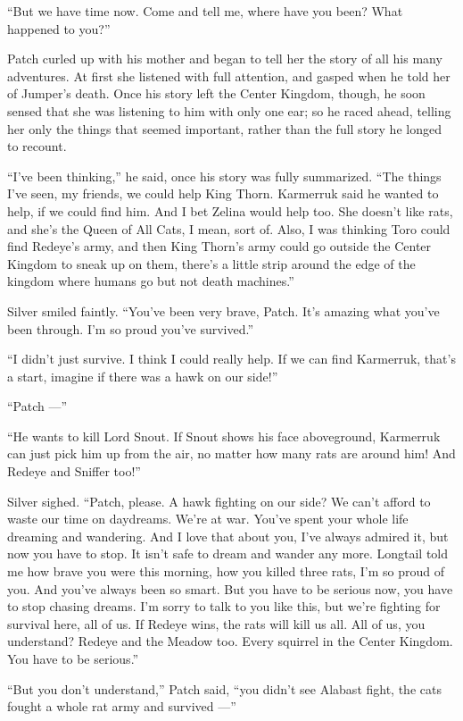 \documentclass[ebook,oneside,openany,12pt]{memoir}
\begin{document}
“But we have time now. Come and tell me, where have you been? What
happened to you?”

Patch curled up with his mother and began to tell her the story of all
his many adventures. At first she listened with full attention, and
gasped when he told her of Jumper’s death. Once his story left the
Center Kingdom, though, he soon sensed that she was listening to him
with only one ear; so he raced ahead, telling her only the things that
seemed important, rather than the full story he longed to recount.

“I’ve been thinking,” he said, once his story was fully
summarized. “The things I’ve seen, my friends, we could help King
Thorn. Karmerruk said he wanted to help, if we could find him. And I
bet Zelina would help too. She doesn’t like rats, and she’s the Queen
of All Cats, I mean, sort of. Also, I was thinking Toro could find
Redeye’s army, and then King Thorn’s army could go outside the Center
Kingdom to sneak up on them, there’s a little strip around the edge of
the kingdom where humans go but not death machines.”

Silver smiled faintly. “You’ve been very brave, Patch. It’s amazing
what you’ve been through. I’m so proud you’ve survived.”

“I didn’t just survive. I think I could really help. If we can find
Karmerruk, that’s a start, imagine if there was a hawk on our side!”

“Patch —”

“He wants to kill Lord Snout. If Snout shows his face aboveground,
Karmerruk can just pick him up from the air, no matter how many rats
are around him! And Redeye and Sniffer too!”

Silver sighed. “Patch, please. A hawk fighting on our side? We can’t
afford to waste our time on daydreams. We’re at war. You’ve spent your
whole life dreaming and wandering. And I love that about you, I’ve
always admired it, but now you have to stop. It isn’t safe to dream
and wander any more. Longtail told me how brave you were this morning,
how you killed three rats, I’m so proud of you. And you’ve always been
so smart. But you have to be serious now, you have to stop chasing
dreams. I’m sorry to talk to you like this, but we’re fighting for
survival here, all of us. If Redeye wins, the rats will kill us
all. All of us, you understand? Redeye and the Meadow too. Every
squirrel in the Center Kingdom. You have to be serious.”

“But you don’t understand,” Patch said, “you didn’t see Alabast fight,
the cats fought a whole rat army and survived —”
\end{document}
